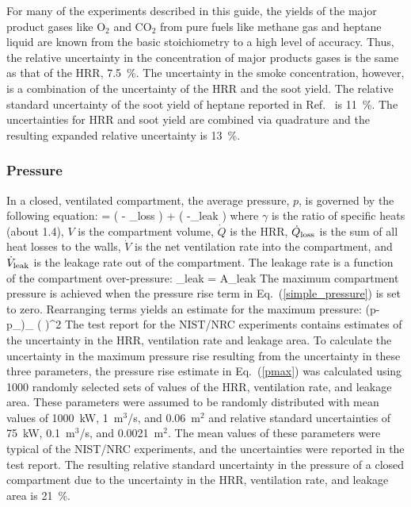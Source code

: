 For many of the experiments described in this guide, the yields of the major product gases like O$_2$ and CO$_2$ from pure fuels like methane gas and heptane liquid are known from the basic stoichiometry to a high level of accuracy. Thus, the relative uncertainty in the concentration of major products gases is the same as that of the HRR, 7.5~\%. The uncertainty in the smoke concentration, however, is a combination of the uncertainty of the HRR and the soot yield. The relative standard uncertainty of the soot yield of heptane reported in Ref.~\cite{Hamins:SP1013-1} is 11~\%. The uncertainties for HRR and soot yield are combined via quadrature and the resulting expanded relative uncertainty is 13~\%.

\subsubsection{Pressure}

In a closed, ventilated compartment, the average pressure, $p$, is governed by the following equation:
\be
    =  \left(  - _{\rm loss} \right) +  \left( -_{\rm leak} \right) \label{simple_pressure}
\ee
where $\gamma$ is the ratio of specific heats (about 1.4), $V$ is the compartment volume, $\dot{Q}$ is the HRR, $\dot{Q}_{\rm loss}$ is the sum of all heat losses to the walls, $\dot{V}$ is the net ventilation rate into the compartment, and $\dot{V}_{\rm leak}$ is the leakage rate out of the compartment. The leakage rate is a function of the compartment over-pressure:
\be
   _{\rm leak} = A_{\rm leak} 
\ee
The maximum compartment pressure is achieved when the pressure rise term in Eq.~(\ref{simple_pressure}) is set to zero. Rearranging terms yields an estimate for the maximum pressure:
\be
   (p-p_\infty)_{\max} \approx {} \left(  \right)^2 \label{pmax}
\ee
The test report for the NIST/NRC experiments contains estimates of the uncertainty in the HRR, ventilation rate and leakage area. To calculate the uncertainty in the maximum pressure rise resulting from the uncertainty in these three parameters, the pressure rise estimate in Eq.~(\ref{pmax}) was calculated using 1000 randomly selected sets of values of the HRR, ventilation rate, and leakage area. These parameters were assumed to be randomly distributed with mean values of 1000~kW, 1~m$^3$/s, and 0.06~m$^2$ and relative standard uncertainties of 75~kW, 0.1~m$^3$/s, and 0.0021~m$^2$. The mean values of these parameters were typical of the NIST/NRC experiments, and the uncertainties were reported in the test report. The resulting relative standard uncertainty in the pressure of a closed compartment due to the uncertainty in the HRR, ventilation rate, and leakage area is 21~\%.

